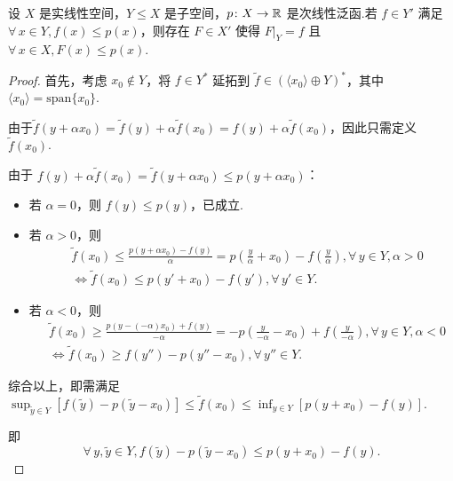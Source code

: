 \begin{theorem}
    设 $X$ 是实线性空间，$Y \leq X$ 是子空间，$p \colon X \to \mathbb{R}$ 是次线性泛函.若 $f \in Y'$ 满足 $\forall\, x \in Y,f(x) \leq p(x)$，则存在 $F \in X'$ 使得 $F|_Y = f$ 且 $\forall\, x \in X,F(x) \leq p(x)$.
\end{theorem}
\begin{proof}
    首先，考虑 $x_0 \notin Y$，将 $f \in Y^*$ 延拓到 $\tilde{f} \in (\langle x_0 \rangle \oplus Y)^*$，其中 $\langle x_0 \rangle = \mathrm{span}\{x_0\}$.\par
    由于$\tilde{f}(y + \alpha x_0) = \tilde{f}(y) + \alpha \tilde{f}(x_0) = f(y) + \alpha \tilde{f}(x_0)$，因此只需定义 $\tilde{f}(x_0)$.\par
    由于 $f(y) + \alpha \tilde{f}(x_0) = \tilde{f}(y + \alpha x_0) \leq p(y + \alpha x_0)$：
    \begin{itemize}
        \item 若 $\alpha = 0$，则 $f(y) \leq p(y)$，已成立.
        \item 若 $\alpha > 0$，则\begin{align*}
            &\tilde{f}(x_0) \leq \frac{p(y + \alpha x_0) - f(y)}{\alpha} = p\left(\frac{y}{\alpha} + x_0\right) - f\left(\frac{y}{\alpha}\right), \forall\, y \in Y, \alpha > 0 \\
            &\Longleftrightarrow\tilde{f}(x_0) \leq p(y' + x_0) - f(y'), \forall\, y' \in Y.
        \end{align*}
        \item 若 $\alpha < 0$，则\begin{align*}
            &\tilde{f}(x_0) \geq \frac{p(y - (-\alpha) x_0) + f(y)}{-\alpha} = -p\left(\frac{y}{-\alpha} - x_0\right) + f\left(\frac{y}{-\alpha}\right), \forall\, y \in Y, \alpha < 0  \\
            &\Longleftrightarrow \tilde{f}(x_0) \geq f(y'') - p(y'' - x_0), \forall\, y'' \in Y.
        \end{align*}
    \end{itemize}\par
    综合以上，即需满足 $\sup_{\tilde{y} \in Y} [f(\tilde{y}) - p(\tilde{y} - x_0)] \leq \tilde{f}(x_0) \leq \inf_{y \in Y} [p(y + x_0) - f(y)]$.\par
    即
    \begin{equation*}
        \forall\, y,\tilde{y} \in Y, f(\tilde{y}) - p(\tilde{y} - x_0) \leq p(y + x_0) - f(y).
    \end{equation*}\par

\end{proof}
